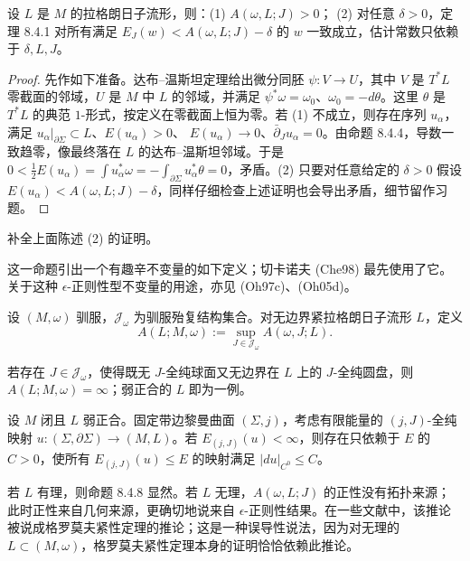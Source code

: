 \begin{proposition}\label{prop:ch8-positive-bubbling-threshold}
设 $L$ 是 $M$ 的拉格朗日子流形，则：(1) $A(\omega,L;J)>0$；
(2) 对任意 $\delta>0$，定理 8.4.1 对所有满足
$E_J(w)<A(\omega,L;J)-\delta$ 的 $w$ 一致成立，估计常数只依赖于
$\delta,L,J$。
\end{proposition}
\begin{proof}
先作如下准备。达布--温斯坦定理给出微分同胚 $\psi:V\to U$，其中
$V$ 是 $T^*L$ 零截面的邻域，$U$ 是 $M$ 中 $L$ 的邻域，并满足
$\psi^*\omega=\omega_0$、$\omega_0=-d\theta$。这里 $\theta$ 是 $T^*L$ 的典范
$1$-形式，按定义在零截面上恒为零。若 (1) 不成立，则存在序列 $u_\alpha$，满足
$u_\alpha|_{\partial\Sigma}\subset L$、$E(u_\alpha)>0$、
$E(u_\alpha)\to0$、$\bar\partial_Ju_\alpha=0$。由命题 8.4.4，导数一致趋零，像最终落在 $L$ 的达布--温斯坦邻域。于是
$0<\frac12E(u_\alpha)=\int u_\alpha^*\omega=-\int_{\partial\Sigma}u_\alpha^*\theta=0$，矛盾。(2) 只要对任意给定的 $\delta>0$ 假设
$E(u_\alpha)<A(\omega,L;J)-\delta$，同样仔细检查上述证明也会导出矛盾，细节留作习题。
\end{proof}

\begin{exercise}\label{ex:ch8-uniform-bubbling-threshold}
补全上面陈述 (2) 的证明。
\end{exercise}

这一命题引出一个有趣辛不变量的如下定义；切卡诺夫 (Che98) 最先使用了它。
关于这种 $\epsilon$-正则性型不变量的用途，亦见 (Oh97c)、(Oh05d)。
\begin{definition}\label{def:ch8-lagrangian-epsilon-invariant}
设 $(M,\omega)$ 驯服，$\mathcal J_\omega$ 为驯服殆复结构集合。对无边界紧拉格朗日子流形 $L$，定义
\[
 A(L;M,\omega):=\sup_{J\in\mathcal J_\omega}A(\omega,J;L).
\]
\end{definition}
若存在 $J\in\mathcal J_\omega$，使得既无 $J$-全纯球面又无边界在 $L$ 上的
$J$-全纯圆盘，则 $A(L;M,\omega)=\infty$；弱正合的 $L$ 即为一例。

\begin{corollary}\label{cor:ch8-weakly-exact-c0-bound}
设 $M$ 闭且 $L$ 弱正合。固定带边黎曼曲面 $(\Sigma,j)$，考虑有限能量的
$(j,J)$-全纯映射 $u:(\Sigma,\partial\Sigma)\to(M,L)$。若
$E_{(j,J)}(u)<\infty$，则存在只依赖于 $E$ 的 $C>0$，使所有
$E_{(j,J)}(u)\leq E$ 的映射满足 $|du|_{C^0}\leq C$。
\end{corollary}

\begin{remark}\label{rem:ch8-rational-lagrangian}
若 $L$ 有理，则命题 8.4.8 显然。若 $L$ 无理，$A(\omega,L;J)$ 的正性没有拓扑来源；此时正性来自几何来源，更确切地说来自 $\epsilon$-正则性结果。在一些文献中，该推论被说成格罗莫夫紧性定理的推论；这是一种误导性说法，因为对无理的 $L\subset(M,\omega)$，格罗莫夫紧性定理本身的证明恰恰依赖此推论。
\end{remark}

